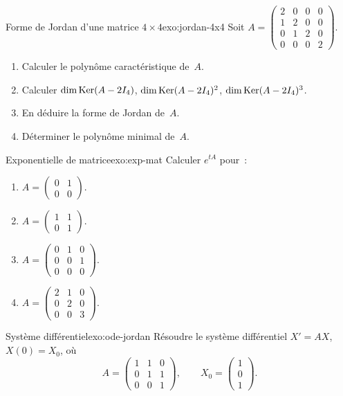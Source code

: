 \begin{exercise}{Forme de Jordan d'une matrice $4\times 4$}{exo:jordan-4x4}
  \intermediate
  Soit $A=\begin{pmatrix}2&0&0&0\\1&2&0&0\\0&1&2&0\\0&0&0&2\end{pmatrix}$.
  \begin{enumerate}[label=(\alph*)]
    \item Calculer le polynôme caractéristique de~$A$.
    \item Calculer $\dim\operatorname{Ker}(A-2I_4)$, $\dim\operatorname{Ker}(A-2I_4)^2$,
      $\dim\operatorname{Ker}(A-2I_4)^3$.
    \item En déduire la forme de Jordan de~$A$.
    \item Déterminer le polynôme minimal de~$A$.
  \end{enumerate}
\end{exercise}

\begin{exercise}{Exponentielle de matrice}{exo:exp-mat}
  \intermediate
  Calculer $e^{tA}$ pour~:
  \begin{enumerate}[label=(\alph*)]
    \item $A=\begin{pmatrix}0&1\\0&0\end{pmatrix}$.
    \item $A=\begin{pmatrix}1&1\\0&1\end{pmatrix}$.
    \item $A=\begin{pmatrix}0&1&0\\0&0&1\\0&0&0\end{pmatrix}$.
    \item $A=\begin{pmatrix}2&1&0\\0&2&0\\0&0&3\end{pmatrix}$.
  \end{enumerate}
\end{exercise}

\begin{exercise}{Système différentiel}{exo:ode-jordan}
  \intermediate
  Résoudre le système différentiel $X'=AX$, $X(0)=X_0$, où
  \[
    A=\begin{pmatrix}1&1&0\\0&1&1\\0&0&1\end{pmatrix},\qquad
    X_0=\begin{pmatrix}1\\0\\1\end{pmatrix}.
  \]
\end{exercise}


